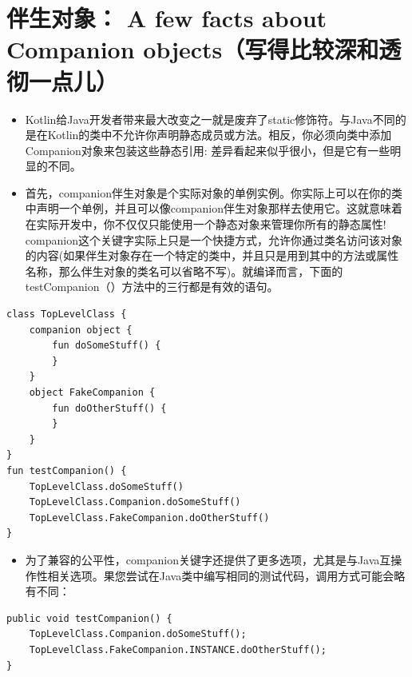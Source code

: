 \documentclass[9pt, b5paper]{article}
\begin{document}
\section{伴生对象：  A few facts about Companion objects（写得比较深和透彻一点儿）}
\label{sec-4}
\begin{itemize}
\item Kotlin给Java开发者带来最大改变之一就是废弃了static修饰符。与Java不同的是在Kotlin的类中不允许你声明静态成员或方法。相反，你必须向类中添加Companion对象来包装这些静态引用: 差异看起来似乎很小，但是它有一些明显的不同。
\item 首先，companion伴生对象是个实际对象的单例实例。你实际上可以在你的类中声明一个单例，并且可以像companion伴生对象那样去使用它。这就意味着在实际开发中，你不仅仅只能使用一个静态对象来管理你所有的静态属性! companion这个关键字实际上只是一个快捷方式，允许你通过类名访问该对象的内容(如果伴生对象存在一个特定的类中，并且只是用到其中的方法或属性名称，那么伴生对象的类名可以省略不写)。就编译而言，下面的testCompanion（）方法中的三行都是有效的语句。
\end{itemize}
\begin{verbatim}
class TopLevelClass {
    companion object {
        fun doSomeStuff() {
        }
    }
    object FakeCompanion {
        fun doOtherStuff() {
        }
    }
}
fun testCompanion() {
    TopLevelClass.doSomeStuff()
    TopLevelClass.Companion.doSomeStuff()
    TopLevelClass.FakeCompanion.doOtherStuff()
}
\end{verbatim}
\begin{itemize}
\item 为了兼容的公平性，companion关键字还提供了更多选项，尤其是与Java互操作性相关选项。果您尝试在Java类中编写相同的测试代码，调用方式可能会略有不同：
\end{itemize}
\begin{verbatim}
public void testCompanion() {
    TopLevelClass.Companion.doSomeStuff();
    TopLevelClass.FakeCompanion.INSTANCE.doOtherStuff();
}
\end{verbatim}
\end{document}
